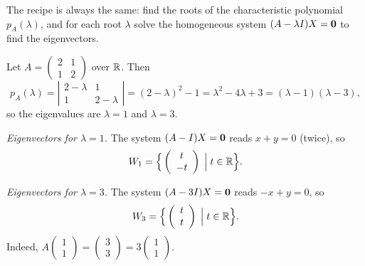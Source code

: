 The recipe is always the same: find the roots of the characteristic polynomial $p_A(\lambda)$, and for each
root $\lambda$ solve the homogeneous system $(A-\lambda I)X = \mathbf{0}$ to find the eigenvectors.

\begin{example}
Let $A = \left( \begin{smallmatrix} 2 & 1\\ 1 & 2 \end{smallmatrix} \right)$ over $\mathbb{R}$. Then
\[
p_A(\lambda) = \left| \begin{array}{cc} 2-\lambda & 1\\ 1 & 2-\lambda \end{array} \right|
= (2-\lambda)^2 - 1 = \lambda^2-4\lambda+3 = (\lambda-1)(\lambda-3),
\]
so the eigenvalues are $\lambda = 1$ and $\lambda = 3$.

\medskip
\noindent\emph{Eigenvectors for $\lambda = 1$.} The system $(A-I)X = \mathbf{0}$ reads $x+y = 0$ (twice), so
\[
W_1 = \Big\{ \left( \begin{array}{c} t \\ -t \end{array} \right) \;\Big|\; t\in \mathbb{R} \Big\}.
\]

\noindent\emph{Eigenvectors for $\lambda = 3$.} The system $(A-3I)X = \mathbf{0}$ reads $-x+y = 0$, so
\[
W_3 = \Big\{ \left( \begin{array}{c} t \\ t \end{array} \right) \;\Big|\; t\in \mathbb{R} \Big\}.
\]
Indeed, $A\left( \begin{smallmatrix} 1\\ 1 \end{smallmatrix} \right)
= \left( \begin{smallmatrix} 3\\ 3 \end{smallmatrix} \right)
= 3 \left( \begin{smallmatrix} 1\\ 1 \end{smallmatrix} \right)$.
\end{example}

